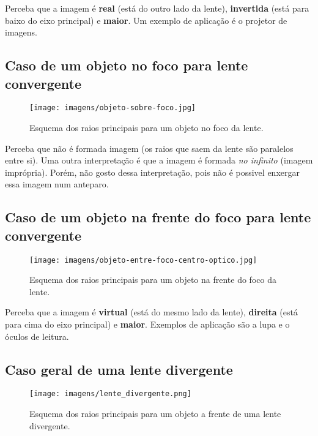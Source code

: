 \documentclass[12pt]{extarticle}
\newcommand{\<}{\langle}
\renewcommand{\>}{\rangle}
\theoremstyle{definition}
\begin{document}
Perceba que a imagem é \textbf{real} (está do outro lado da lente), \textbf{invertida} (está para baixo do eixo principal) e \textbf{maior}. Um exemplo de aplicação é o projetor de imagens.

\subsection{Caso de um objeto no foco para lente convergente}

\begin{figure}[H]
    \centering
    \texttt{[image: imagens/objeto-sobre-foco.jpg]}
    \caption{Esquema dos raios principais para um objeto no foco da lente. \cite{mundoeducacao}}
    \label{fig:obj_no_foco}
\end{figure}

Perceba que não é formada imagem (os raios que saem da lente são paralelos entre si). Uma outra interpretação é que a imagem é formada \textit{no infinito} (imagem imprópria). Porém, não gosto dessa interpretação, pois não é possivel enxergar essa imagem num anteparo.
\subsection{Caso de um objeto na frente do foco para lente convergente}

\begin{figure}[H]
    \centering
    \texttt{[image: imagens/objeto-entre-foco-centro-optico.jpg]}
    \caption{Esquema dos raios principais para um objeto na frente do foco da lente. \cite{mundoeducacao}}
    \label{fig:obj_a_frente_foco}
\end{figure}

Perceba que a imagem é \textbf{virtual} (está do mesmo lado da lente), \textbf{direita} (está para cima do eixo principal) e \textbf{maior}. Exemplos de aplicação são a lupa e o óculos de leitura.

\subsection{Caso geral de uma lente divergente}

\begin{figure}[H]
    \centering
    \texttt{[image: imagens/lente\_divergente.png]}
    \caption{Esquema dos raios principais para um objeto a frente de uma lente divergente. \cite{alunosonline}}
    \label{fig:obj_divergente}
\end{figure}
\end{document}
